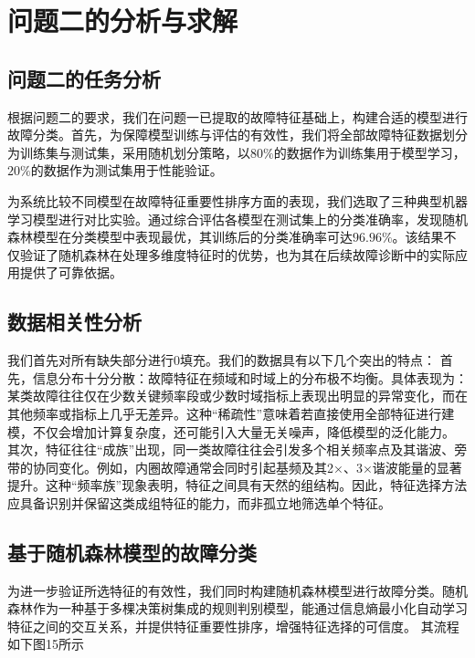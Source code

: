 \documentclass[a4paper]{CPIPC}
\numberwithin{equation}{section}
\begin{document}
    

\newpage

\section{问题二的分析与求解}
\subsection{问题二的任务分析}
根据问题二的要求，我们在问题一已提取的故障特征基础上，构建合适的模型进行故障分类。首先，为保障模型训练与评估的有效性，我们将全部故障特征数据划分为训练集与测试集，采用随机划分策略，以$80\%$的数据作为训练集用于模型学习，$20\%$的数据作为测试集用于性能验证。

为系统比较不同模型在故障特征重要性排序方面的表现，我们选取了三种典型机器学习模型进行对比实验。通过综合评估各模型在测试集上的分类准确率，发现随机森林模型在分类模型中表现最优，其训练后的分类准确率可达$96.96\%$。该结果不仅验证了随机森林在处理多维度特征时的优势，也为其在后续故障诊断中的实际应用提供了可靠依据。

\subsection{数据相关性分析}

我们首先对所有缺失部分进行0填充。我们的数据具有以下几个突出的特点：
首先，信息分布十分分散：故障特征在频域和时域上的分布极不均衡。具体表现为：某类故障往往仅在少数关键频率段或少数时域指标上表现出明显的异常变化，而在其他频率或指标上几乎无差异。这种“稀疏性”意味着若直接使用全部特征进行建模，不仅会增加计算复杂度，还可能引入大量无关噪声，降低模型的泛化能力。
其次，特征往往“成族”出现，同一类故障往往会引发多个相关频率点及其谐波、旁带的协同变化。例如，内圈故障通常会同时引起基频及其2×、3×谐波能量的显著提升。这种“频率族”现象表明，特征之间具有天然的组结构。因此，特征选择方法应具备识别并保留这类成组特征的能力，而非孤立地筛选单个特征。


\subsection{基于随机森林模型的故障分类}

为进一步验证所选特征的有效性，我们同时构建随机森林模型进行故障分类。随机森林作为一种基于多棵决策树集成的规则判别模型，能通过信息熵最小化自动学习特征之间的交互关系，并提供特征重要性排序，增强特征选择的可信度\cite{ref5}。
其流程如下图15所示
\end{document}
